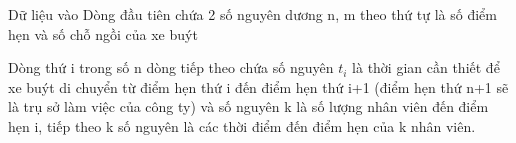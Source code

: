 Dữ liệu vào  
Dòng đầu tiên chứa 2 số nguyên dương n, m theo thứ tự là số điểm hẹn và số chỗ ngồi của xe buýt  

   Dòng thứ i trong số n dòng tiếp theo chứa số nguyên $t_{i}$   là thời gian cần thiết để xe buýt di chuyển từ điểm hẹn thứ i đến điểm hẹn thứ   i+1 (điểm hẹn thứ n+1 sẽ là trụ sở làm việc của công ty) và số nguyên k là số lượng nhân viên đến điểm hẹn i, tiếp theo k số nguyên là các thời điểm đến   điểm hẹn của k nhân viên.